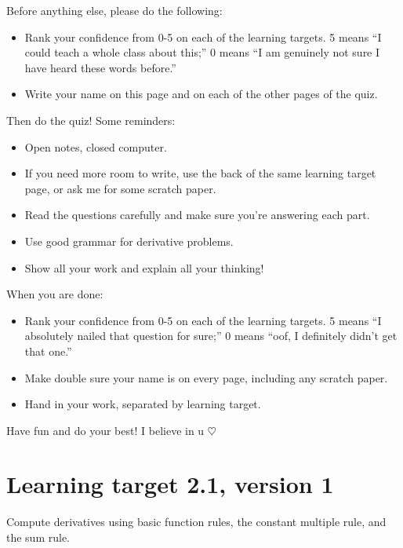 Before anything else, please do the following:
\begin{itemize}
    \item Rank your confidence from 0-5 on each of the learning targets. 5 means ``I could teach a whole class about this;'' 0 means ``I am genuinely not sure I have heard these words before.''
    \item Write your name on this page and on each of the other pages of the quiz.
\end{itemize}

Then do the quiz! Some reminders:
\begin{itemize}
    \item Open notes, closed computer.
    \item If you need more room to write, use the back of the same learning target page, or ask me for some scratch paper.
    \item Read the questions carefully and make sure you're answering each part.
    \item Use good grammar for derivative problems.
    \item Show all your work and explain all your thinking!
\end{itemize}

When you are done:
\begin{itemize}
    \item Rank your confidence from 0-5 on each of the learning targets. 5 means ``I absolutely nailed that question for sure;'' 0 means ``oof, I definitely didn't get that one.''
    \item Make double sure your name is on every page, including any scratch paper.
    \item Hand in your work, separated by learning target.
\end{itemize}

Have fun and do your best! I believe in u $\heartsuit$


\pagebreak

\section{Learning target 2.1, version 1}

Compute derivatives using basic function rules, the constant multiple rule, and the sum rule.

\hrulefill

